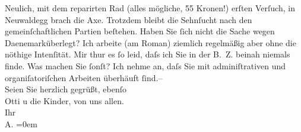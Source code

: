 \begin{ledgroupsized}[t]{13cm}
           \pstart
           Neulich, mit dem reparirten Rad (alles mögliche, 55 Kronen!) erſten Verſuch, in Neuwaldegg brach die Axe. Trotzdem bleibt die
               Sehnſucht nach den gemeinſchaftlichen Partien beſtehen. Haben Sie ſich nicht die
               Sache wegen Daenemarküberlegt? \pend
           \pstart
           Ich arbeite (am Roman)
               ziemlich regelmäßig aber ohne die nöthige Intenſität. Mir thur es ſo leid, daſs ich
               Sie in der B. Z. beinah niemals finde. Was
               machen Sie ſonſt? Ich nehme an, daſs Sie mit adminiſtrativen und organiſatoriſchen
               Arbeiten überhäuft ſind.– {\\[\baselineskip]}Seien Sie herzlich gegrüßt, ebenſo {\\[\baselineskip]}Otti u die Kinder, von uns allen. {\\[\baselineskip]}Ihr {\\[\baselineskip]}\spacefill\mbox{A.}\pend
           \leftskip=0em{}
         
         \endnumbering{}\end{ledgroupsized}\begin{anhang}\end{anhang}\newcommand{\dateiname}{L03004}\newcommand{\titel}{Arthur Schnitzler an Felix Salten, 27. 4. 1906}\newcommand{\editorInnen}{Martin Anton Müller und Laura Untner}
      